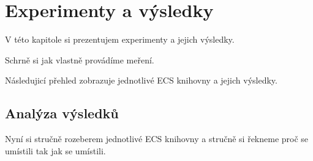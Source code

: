 \chapter{Experimenty a výsledky}
V této kapitole si prezentujem experimenty a jejich výsledky.

Schrně si jak vlastně provádíme meření.

Následujicí přehled zobrazuje jednotlivé ECS knihovny a jejich výsledky.

\section{Analýza výsledků}
Nyní si stručně rozeberem jednotlivé ECS knihovny a stručně si řekneme proč se umístili tak jak se umístili.

